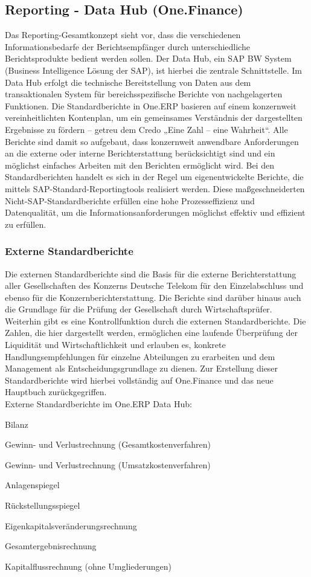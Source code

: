 \subsection{Reporting - Data Hub (One.Finance)}
Das Reporting-Gesamtkonzept sieht vor, dass die verschiedenen Informationsbedarfe der Berichtsempfänger durch unterschiedliche Berichtsprodukte bedient werden sollen. 
Der Data Hub, ein SAP BW System (Business Intelligence Lösung der SAP), ist hierbei die zentrale Schnittstelle. Im Data Hub erfolgt die technische Bereitstellung von Daten aus dem transaktionalen System für bereichsspezifische Berichte von nachgelagerten Funktionen.
Die Standardberichte in One.ERP basieren auf einem konzernweit vereinheitlichten Kontenplan, um ein gemeinsames Verständnis der dargestellten Ergebnisse zu fördern – getreu dem Credo „Eine Zahl – eine Wahrheit“. Alle Berichte sind damit so aufgebaut, dass konzernweit anwendbare Anforderungen an die externe oder interne Berichterstattung berücksichtigt sind und ein möglichst einfaches Arbeiten mit den Berichten ermöglicht wird. 
Bei den Standardberichten handelt es sich in der Regel um eigenentwickelte Berichte, die mittels SAP-Standard-Reportingtools realisiert werden. Diese maßgeschneiderten Nicht-SAP-Standardberichte erfüllen eine hohe Prozesseffizienz und Datenqualität, um die Informationsanforderungen möglichst effektiv und effizient zu erfüllen.
\subsubsection{Externe Standardberichte}
Die externen Standardberichte sind die Basis für die externe Berichterstattung aller Gesellschaften des Konzerns Deutsche Telekom für den Einzelabschluss und ebenso für die Konzernberichterstattung. Die Berichte sind darüber hinaus auch die Grundlage für die Prüfung der Gesellschaft durch Wirtschaftsprüfer. 
Weiterhin gibt es eine Kontrollfunktion durch die externen Standardberichte. Die Zahlen, die hier dargestellt werden, ermöglichen eine laufende Überprüfung der Liquidität und Wirtschaftlichkeit und erlauben es, konkrete Handlungsempfehlungen für einzelne Abteilungen zu erarbeiten und dem Management als Entscheidungsgrundlage zu dienen. Zur Erstellung dieser Standardberichte wird hierbei vollständig auf One.Finance und das neue Hauptbuch zurückgegriffen. \\
Externe Standardberichte im One.ERP Data Hub:
\begin{compactitem}  
\item 	  Bilanz
\item     Gewinn- und Verlustrechnung (Gesamtkostenverfahren)
\item     Gewinn- und Verlustrechnung (Umsatzkostenverfahren)
\item     Anlagenspiegel
\item    Rückstellungsspiegel
 \item    Eigenkapitalsveränderungsrechnung
\item     Gesamtergebnisrechnung
 \item    Kapitalflussrechnung (ohne Umgliederungen)
\end{compactitem}
